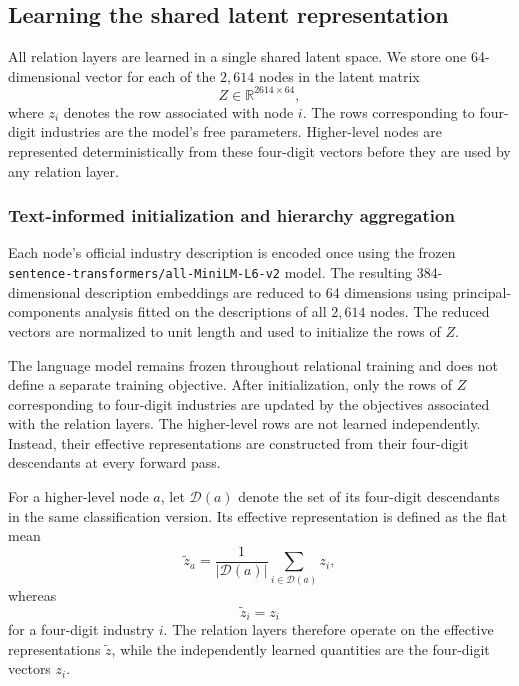 \documentclass[9pt,twoside]{pnas-new}
\begin{document}
\subsection{Learning the shared latent representation}
\label{subsec:learning-opportunity-space}

All relation layers are learned in a single shared latent space. We store one
64-dimensional vector for each of the $2,614$ nodes in the latent matrix
\begin{equation}
Z\in\mathbb{R}^{2614\times64},
\end{equation}
where $z_i$ denotes the row associated with node $i$. The rows corresponding to
four-digit industries are the model's free parameters. Higher-level nodes are
represented deterministically from these four-digit vectors before they are
used by any relation layer.

\subsubsection{Text-informed initialization and hierarchy aggregation}
\label{subsec:text-initialization}

Each node's official industry description is encoded once using the frozen
\texttt{sentence-transformers/all-MiniLM-L6-v2} model. The resulting
384-dimensional description embeddings are reduced to 64 dimensions using
principal-components analysis fitted on the descriptions of all $2,614$ nodes.
The reduced vectors are normalized to unit length and used to initialize the
rows of $Z$.

The language model remains frozen throughout relational training and does not
define a separate training objective. After initialization, only the rows of
$Z$ corresponding to four-digit industries are updated by the objectives
associated with the relation layers. The higher-level rows are not learned
independently. Instead, their effective representations are constructed from
their four-digit descendants at every forward pass.

For a higher-level node $a$, let $\mathcal{D}(a)$ denote the set of its
four-digit descendants in the same classification version. Its effective
representation is defined as the flat mean
\begin{equation}
\widetilde{z}_a
=
\frac{1}{|\mathcal{D}(a)|}
\sum_{i\in\mathcal{D}(a)} z_i,
\label{eq:hub-aggregation}
\end{equation}
whereas
\begin{equation}
\widetilde{z}_i=z_i
\end{equation}
for a four-digit industry $i$. The relation layers therefore operate on the
effective representations $\widetilde{z}$, while the independently learned
quantities are the four-digit vectors $z_i$.
\end{document}
